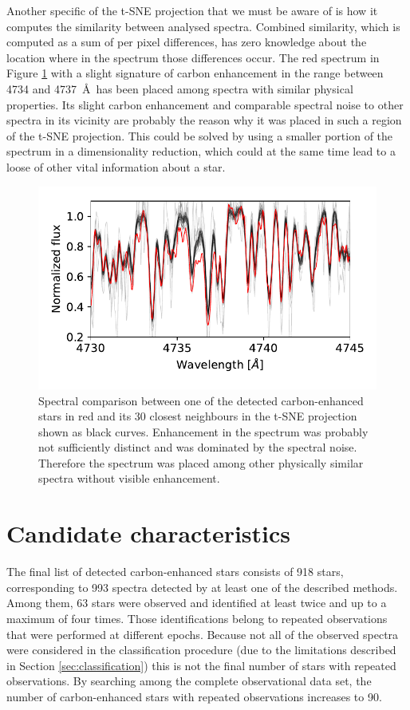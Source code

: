 Another specific of the t-SNE projection that we must be aware of is how it computes the similarity between analysed spectra. Combined similarity, which is computed as a sum of per pixel differences, has zero knowledge about the location where in the spectrum those differences occur. The red spectrum in Figure \ref{fig:tsne_30close} with a slight signature of carbon enhancement in the range between 4734 and 4737~\AA\ has been placed among spectra with similar physical properties. Its slight carbon enhancement and comparable spectral noise to other spectra in its vicinity are probably the reason why it was placed in such a region of the t-SNE projection. This could be solved by using a smaller portion of the spectrum in a dimensionality reduction, which could at the same time lead to a loose of other vital information about a star.

\begin{figure}
	\centering
	\includegraphics[width=\columnwidth]{150206004301057_tsne_close30.pdf}
	\caption{Spectral comparison between one of the detected carbon-enhanced stars in red and its 30 closest neighbours in the t-SNE projection shown as black curves. Enhancement in the spectrum was probably not sufficiently distinct and was dominated by the spectral noise. Therefore the spectrum was placed among other physically similar spectra without visible enhancement.}
	\label{fig:tsne_30close}
\end{figure}

\section{Candidate characteristics}
\label{sec:analysis}
The final list of detected carbon-enhanced stars consists of 918 stars, corresponding to 993 spectra detected by at least one of the described methods. Among them, 63 stars were observed and identified at least twice and up to a maximum of four times. Those identifications belong to repeated observations that were performed at different epochs. Because not all of the observed spectra were considered in the classification procedure (due to the limitations described in Section \ref{sec:classification}) this is not the final number of stars with repeated observations. By searching among the complete observational data set, the number of carbon-enhanced stars with repeated observations increases to 90.

